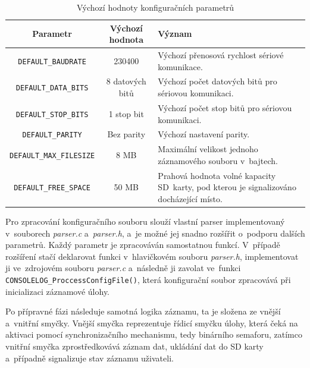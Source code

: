 \begin{table}[h]
    \centering
    \begin{tabularx}{\textwidth}{|c|c|X|}
        \hline
        \textbf{Parametr} & \textbf{Výchozí hodnota} & \textbf{Význam} \\
        \hline
        \texttt{DEFAULT\_BAUDRATE} & 230400 & Výchozí přenosová rychlost sériové komunikace. \\
        \hline
        \texttt{DEFAULT\_DATA\_BITS} & 8 datových bitů & Výchozí počet datových bitů pro sériovou komunikaci. \\
        \hline
        \texttt{DEFAULT\_STOP\_BITS} & 1 stop bit & Výchozí počet stop bitů pro sériovou komunikaci. \\
        \hline
        \texttt{DEFAULT\_PARITY} & Bez parity & Výchozí nastavení parity. \\
        \hline
        \texttt{DEFAULT\_MAX\_FILESIZE} & 8 MB & Maximální velikost jednoho záznamového souboru v~bajtech. \\
        \hline
        \texttt{DEFAULT\_FREE\_SPACE} & 50 MB & Prahová hodnota volné kapacity SD~karty, pod kterou je signalizováno docházející místo. \\
        \hline
    \end{tabularx}
    \caption{Výchozí hodnoty konfiguračních parametrů}
    \label{tab:default-parameters}
\end{table}

Pro zpracování konfiguračního souboru slouží vlastní parser implementovaný v~souborech \textit{parser.c} a~\textit{parser.h}, a~je možné jej snadno rozšířit o~podporu dalších parametrů. Každý parametr je zpracováván samostatnou funkcí. V~případě rozšíření stačí deklarovat funkci v~hlavičkovém souboru \textit{parser.h}, implementovat ji ve~zdrojovém souboru \textit{parser.c} a~následně ji zavolat ve~funkci \texttt{CONSOLELOG\_ProccessConfigFile()}, která konfigurační soubor zpracovává při inicializaci záznamové úlohy.

Po přípravné fázi následuje samotná logika záznamu, ta je složena ze vnější a~vnitřní smyčky. Vnější smyčka reprezentuje řídicí smyčku úlohy, která čeká na aktivaci pomocí synchronizačního mechanismu, tedy binárního semaforu, zatímco vnitřní smyčka zprostředkovává záznam dat, ukládání dat do SD karty a~případně signalizuje stav záznamu uživateli.


